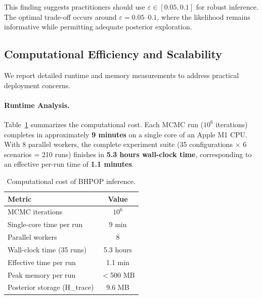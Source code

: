 This finding suggests practitioners should use $\varepsilon \in [0.05, 0.1]$ for robust inference. The optimal trade-off occurs around $\varepsilon = 0.05$--$0.1$, where the likelihood remains informative while permitting adequate posterior exploration.

\subsection{Computational Efficiency and Scalability}
\label{sec:scalability}

We report detailed runtime and memory measurements to address practical deployment concerns.

\paragraph{Runtime Analysis.}
Table~\ref{tab:runtime} summarizes the computational cost. Each MCMC run ($10^6$ iterations) completes in approximately \textbf{9 minutes} on a single core of an Apple M1 CPU. With 8 parallel workers, the complete experiment suite (35 configurations $\times$ 6 scenarios = 210 runs) finishes in \textbf{5.3 hours wall-clock time}, corresponding to an effective per-run time of \textbf{1.1 minutes}.

\begin{table}[htbp]
\caption{Computational cost of BHPOP inference.}
\label{tab:runtime}
\centering
\small
\begin{tabular}{lc}
\toprule
\textbf{Metric} & \textbf{Value} \\
\midrule
MCMC iterations & $10^6$ \\
Single-core time per run & 9 min \\
Parallel workers & 8 \\
Wall-clock time (35 runs) & 5.3 hours \\
Effective time per run & 1.1 min \\
Peak memory per run & $<$500 MB \\
Posterior storage (H\_trace) & 9.6 MB \\
\bottomrule
\end{tabular}
\end{table}

